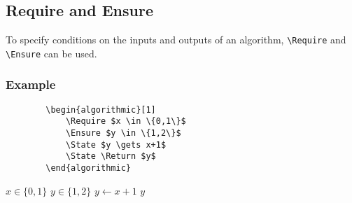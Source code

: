 \documentclass[11pt,a4paper,USenglish]{article}
\begin{document}
\subsection{Require and Ensure}
To specify conditions on the inputs and outputs of an algorithm, \verb|\Require| and \verb|\Ensure| can be used.

\subsubsection*{Example}
\begin{minipage}[t]{0.45\textwidth}
	\begin{verbatim}
		\begin{algorithmic}[1]
		    \Require $x \in \{0,1\}$
		    \Ensure $y \in \{1,2\}$
		    \State $y \gets x+1$
		    \State \Return $y$
		\end{algorithmic}
	\end{verbatim}
\end{minipage}
\hfill
\begin{minipage}[t]{0.45\textwidth}
	\begin{algorithmic}[1]
		\Require $x \in \{0,1\}$
		\Ensure $y \in \{1,2\}$
		\State $y \gets x+1$
		\State \Return $y$
	\end{algorithmic}
\end{minipage}
\end{document}
